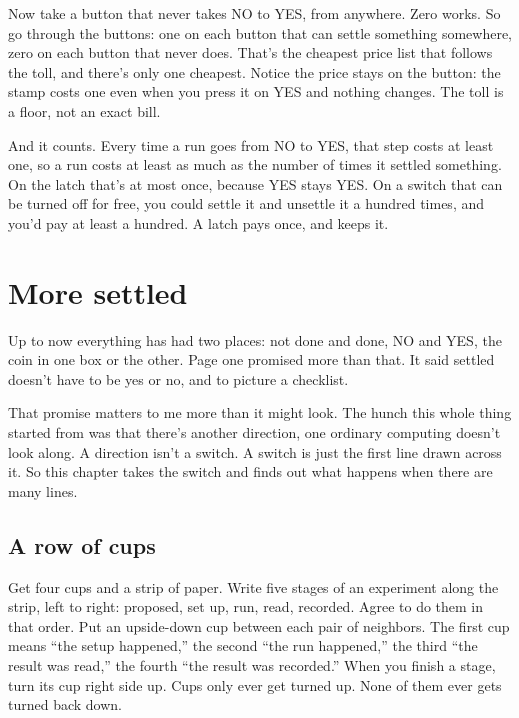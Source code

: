 \documentclass[11pt,twoside]{article}
\theoremstyle{thielethm}
\theoremstyle{thieledef}
\theoremstyle{thieledef}
\theoremstyle{thieledef}
\theoremstyle{thielethm}
\theoremstyle{thieleobs}
\theoremstyle{thielethm}
\begin{document}
Now take a button that never takes NO to YES, from anywhere. Zero works. So go through the buttons: one on each button that can settle something somewhere, zero on each button that never does. That's the cheapest price list that follows the toll, and there's only one cheapest. Notice the price stays on the button: the stamp costs one even when you press it on YES and nothing changes. The toll is a floor, not an exact bill.

And it counts. Every time a run goes from NO to YES, that step costs at least one, so a run costs at least as much as the number of times it settled something. On the latch that's at most once, because YES stays YES. On a switch that can be turned off for free, you could settle it and unsettle it a hundred times, and you'd pay at least a hundred. A latch pays once, and keeps it.

\section{More settled}
\label{sec:more-settled}

Up to now everything has had two places: not done and done, NO and YES, the coin in one box or the other. Page one promised more than that. It said settled doesn't have to be yes or no, and to picture a checklist.

That promise matters to me more than it might look. The hunch this whole thing started from was that there's another direction, one ordinary computing doesn't look along. A direction isn't a switch. A switch is just the first line drawn across it. So this chapter takes the switch and finds out what happens when there are many lines.

\subsection{A row of cups}

Get four cups and a strip of paper. Write five stages of an experiment along the strip, left to right: proposed, set up, run, read, recorded. Agree to do them in that order. Put an upside-down cup between each pair of neighbors. The first cup means ``the setup happened,'' the second ``the run happened,'' the third ``the result was read,'' the fourth ``the result was recorded.'' When you finish a stage, turn its cup right side up. Cups only ever get turned up. None of them ever gets turned back down.
\end{document}
